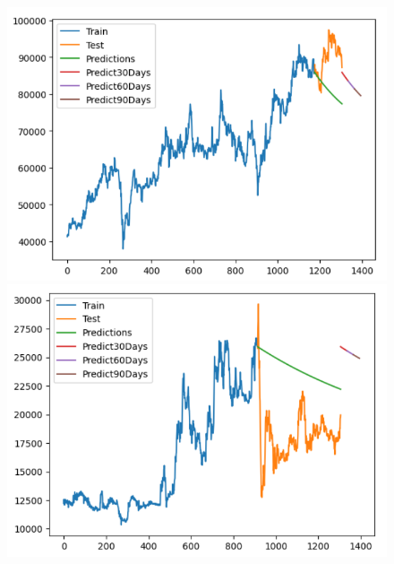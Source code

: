 \begin{figure}[H]
\begin{minipage}{0.15\textwidth}
    \end{minipage}
    \hfill
        \begin{minipage}{0.15\textwidth}
    \centering
    \includegraphics[width=1\textwidth]{resources/chapter-5/newdata1/result/VCB_VARMA_9-1.png}
    \end{minipage}
    \hfill
    \begin{minipage}{0.15\textwidth}
    \centering
    \includegraphics[width=1\textwidth]{resources/chapter-5/newdata1/result/EIB_VARMA_7-3.png}
    \end{minipage}
    \hfill
    \begin{minipage}{0.15\textwidth}
    \centering

\end{minipage}
\end{figure}
